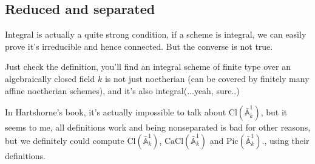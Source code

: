 \documentclass[../main.tex]{subfiles}
\begin{document}
\subsection{Reduced and separated}
\begin{remark}
Integral is actually a quite strong condition, if a scheme is integral, we can easily prove it's irreducible and hence connected. But the converse is not true.
\end{remark}
\begin{remark}
Just check the definition, you'll find an integral scheme of finite type over an algebraically closed field $k$ is not just noetherian (can be covered by finitely many affine noetherian schemes), and it's also integral(...yeah, sure..)
\end{remark}

\begin{example}
In Hartshorne's book, it's actually impossible to talk about $\mathrm{Cl}(\bar{\mathbb{A}}_{k}^{1})$, but it seems to me, all definitions work and being nonseparated is bad for other reasons, but we definitely could compute $\mathrm{Cl}(\bar{\mathbb{A}}_{k}^{1})$, $\mathrm{CaCl}(\bar{\mathbb{A}}_{k}^{1})$ and $\mathrm{Pic}(\bar{\mathbb{A}}_{k}^{1})$., using their definitions. 
\end{example}
\end{document}
